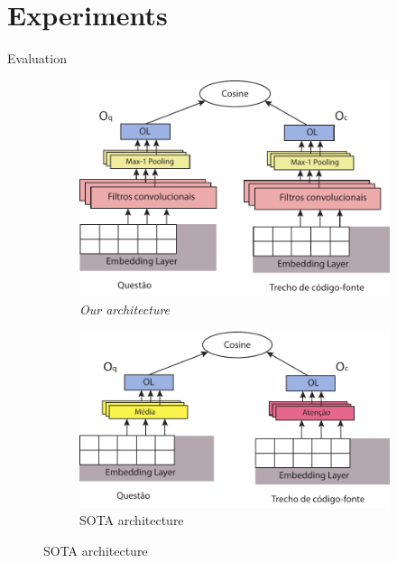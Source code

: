 \documentclass{beamer}
\begin{document}
    \section{Experiments}
    
    \begin{frame}{Evaluation}
      \begin{figure}
          \begin{subfigure}[h]{0.45\textwidth}
            \includegraphics[width=\textwidth]{resources/cnn-architecture-proposal.pdf}
            \caption{\textit{Our architecture}}
            \label{fig:our-architecture}
          \end{subfigure}
          \hspace{1em}%
          \begin{subfigure}[h]{0.45\textwidth}
            \includegraphics[width=\textwidth]{resources/unif-architecture.pdf}
            \caption{SOTA architecture}
            \label{fig:unif-architecture}
          \end{subfigure}
          

\end{figure}
\end{frame}
\end{document}
